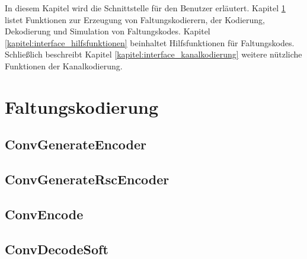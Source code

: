
In diesem Kapitel wird die Schnittstelle für den Benutzer erläutert. Kapitel \ref{kapitel:interface_faltungskodierung} listet Funktionen zur Erzeugung von Faltungskodierern, der Kodierung, Dekodierung und Simulation von Faltungskodes. Kapitel \ref{kapitel:interface_hilfsfunktionen} beinhaltet Hilfsfunktionen für Faltungskodes. Schließlich beschreibt Kapitel \ref{kapitel:interface_kanalkodierung} weitere nützliche Funktionen der Kanalkodierung.

\section{Faltungskodierung}
\label{kapitel:interface_faltungskodierung}

\subsection{ConvGenerateEncoder}


\subsection{ConvGenerateRscEncoder}


\subsection{ConvEncode}


\subsection{ConvDecodeSoft}


